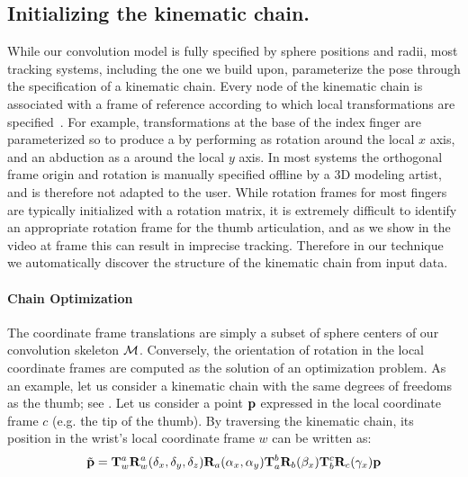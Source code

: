 \subsection{Initializing the kinematic chain.}
While our convolution model is fully specified by sphere positions and radii, most tracking systems, including the one we build upon, parameterize the pose through the specification of a kinematic chain. Every node of the kinematic chain is associated with a frame of reference according to which local transformations are specified~\cite[Fig.2-(middle)]{tagliasacchi2015robust}. For example, transformations at the base of the index finger are parameterized so to produce a  by performing as rotation around the local $x$ axis, and an abduction as a  around the local $y$ axis. In most systems the orthogonal frame origin and rotation is manually specified offline by a 3D modeling artist, and is therefore not adapted to the user. 
% 
While rotation frames for most fingers are typically initialized with a rotation matrix, it is extremely difficult to identify an appropriate rotation frame for the thumb articulation, and as we show in the video at frame \todo{[00:00]} this can result in imprecise tracking. Therefore in our technique we automatically discover the structure of the kinematic chain from input data. 


\paragraph{Chain Optimization}
The coordinate frame translations are simply a subset of sphere centers of our convolution skeleton $\mathcal{M}$.  Conversely, the orientation of rotation in the local coordinate frames are computed as the solution of an optimization problem. As an example, let us consider a kinematic chain with the same degrees of freedoms as the thumb; see . Let us consider a point $\mathbf{p}$ expressed in the local coordinate frame $c$ (e.g. the tip of the thumb). By traversing the kinematic chain, its position in the wrist's local coordinate frame $w$ can be written as:
% 
\begin{equation*}
\tilde{\mathbf{p}} = \mathbf{T}_w^a\mathbf{R}_w^a(\delta_x, \delta_y, \delta_z)
           \mathbf{R}_a(\alpha_x, \alpha_y) 
           \mathbf{T}_a^b \mathbf{R}_b(\beta_x) 
           \mathbf{T}_b^c \mathbf{R}_c(\gamma_x)
           \mathbf{p}
\label{eq:kinematic}
\end{equation*}
% 


